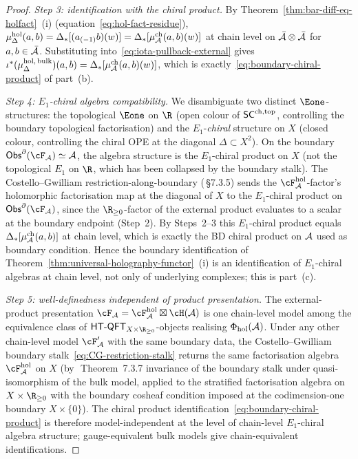 \begin{proof}
\emph{Step 3: identification with the chiral product.}
By Theorem~\ref{thm:bar-diff-eq-holfact}~(i)
(equation~\eqref{eq:hol-fact-residue}),
$\mu^{\mathrm{hol}}_\Delta(a,b) = \Delta_*[(a_{(-1)}b)(w)] =
\Delta_*[\mu^{\mathrm{ch}}_{\mathcal{A}}(a,b)(w)]$ at chain level on
$\bar{\mathcal{A}} \otimes \bar{\mathcal{A}}$ for $a, b \in \bar{\mathcal{A}}$. Substituting
into~\eqref{eq:iota-pullback-external} gives
$\iota^*(\mu^{\mathrm{hol},\,\mathrm{bulk}}_\Delta)(a,b) =
\Delta_*[\mu^{\mathrm{ch}}_{\mathcal{A}}(a,b)(w)]$, which is
exactly~\eqref{eq:boundary-chiral-product} of part~(b).

\emph{Step 4: $E_1$-chiral algebra compatibility.}
We disambiguate two distinct $\Eone$-structures: the topological
$\Eone$ on $\R$ (open colour of $\mathsf{SC}^{\mathrm{ch},\mathrm{top}}$, controlling the
boundary topological factorisation) and the $E_1$-\emph{chiral}
structure on $X$ (closed colour, controlling the chiral OPE at
the diagonal $\Delta\subset X^2$). On the boundary
$\Obs^\partial(\cF_\cA) \simeq \cA$, the algebra structure is the
$E_1$-chiral product on $X$ (not the topological $E_1$ on $\R$,
which has been collapsed by the boundary stalk). The
Costello--Gwilliam restriction-along-boundary
(\cite{CG21}\,\S7.3.5) sends the $\cF_\cA^{\mathrm{hol}}$-factor's
holomorphic factorisation map at the diagonal of $X$ to the
$E_1$-chiral product on $\Obs^\partial(\cF_\cA)$, since the
$\R_{\geq 0}$-factor of the external product evaluates to a scalar at
the boundary endpoint (Step~2). By Steps~2--3 this
$E_1$-chiral product equals
$\Delta_*[\mu^{\mathrm{ch}}_{\mathcal{A}}(a,b)]$ at chain level, which is
exactly the BD chiral product on $\mathcal{A}$ used as boundary
condition. Hence the boundary identification of
Theorem~\ref{thm:universal-holography-functor}~(i) is an
identification of $E_1$-chiral algebras at chain level, not only
of underlying complexes; this is part~(c).

\emph{Step 5: well-definedness independent of product
presentation.}
The external-product presentation
$\cF_\cA = \cF_\cA^{\mathrm{hol}} \boxtimes \cH(\cA)$ is one
chain-level model among the equivalence class of
$\HTQFT_{X \times \R_{\geq 0}}$-objects realising
$\Phi_{\mathrm{hol}}(\mathcal{A})$. Under any other chain-level model
$\cF'_\cA$ with the same boundary data, the Costello--Gwilliam
boundary stalk~\eqref{eq:CG-restriction-stalk} returns the same
factorisation algebra $\cF^{\mathrm{hol}}_\cA$ on $X$
(by~\cite{CG21}\,Theorem~7.3.7 invariance of the boundary stalk
under quasi-isomorphism of the bulk model, applied to the
stratified factorisation algebra on $X \times \R_{\geq 0}$ with
the boundary cosheaf condition imposed at the codimension-one
boundary $X\times\{0\}$). The chiral product
identification~\eqref{eq:boundary-chiral-product} is therefore
model-independent at the level of chain-level $E_1$-chiral algebra
structure; gauge-equivalent bulk models give chain-equivalent
identifications.


\end{proof}
